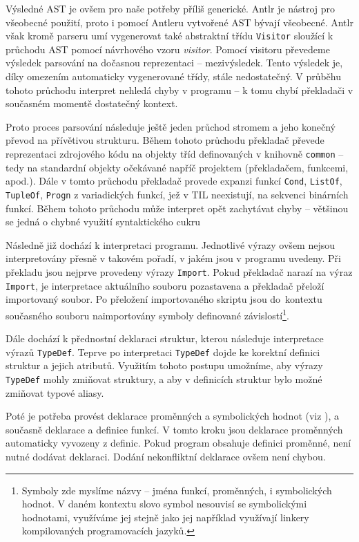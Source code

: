 Výsledné AST je ovšem pro naše potřeby příliš generické. Antlr je nástroj pro všeobecné použití,
proto i pomocí Antleru vytvořené AST bývají všeobecné. Antlr však kromě parseru umí vygenerovat také
abstraktní třídu \lstinline{Visitor} sloužící k průchodu AST pomocí návrhového vzoru
\textit{visitor}. Pomocí visitoru převedeme výsledek parsování na dočasnou reprezentaci --
mezivýsledek. Tento výsledek je, díky omezením automaticky vygenerované třídy, stále nedostatečný.
V průběhu tohoto průchodu interpret nehledá chyby v programu -- k tomu chybí překladači v současném
momentě dostatečný kontext.

Proto proces parsování následuje ještě jeden průchod stromem a jeho konečný převod na přívětivou
strukturu. Během tohoto průchodu překladač převede reprezentaci zdrojového kódu na objekty tříd
definovaných v knihovně \lstinline{common} -- tedy na standardní objekty očekávané napříč projektem
(překladačem, funkcemi, apod.). Dále v tomto průchodu překladač provede expanzi funkcí
\lstinline{Cond}, \lstinline{ListOf}, \lstinline{TupleOf}, \lstinline{Progn} z variadických funkcí,
jež v TIL neexistují, na sekvenci binárních funkcí. Během tohoto průchodu může interpret opět
zachytávat chyby -- většinou se jedná o chybné využití syntaktického cukru

Následně již dochází k interpretaci programu. Jednotlivé výrazy ovšem nejsou interpretovány přesně
v takovém pořadí, v jakém jsou v programu uvedeny. Při překladu jsou nejprve provedeny výrazy
\lstinline{Import}. Pokud překladač narazí na výraz \lstinline{Import}, je interpretace aktuálního
souboru pozastavena a překladač přeloží importovaný soubor. Po přeložení importovaného skriptu
jsou do~kontextu současného souboru naimportovány symboly definované závislostí\footnote{
  Symboly zde myslíme názvy -- jména funkcí, proměnných, i symbolických hodnot. V daném kontextu
  slovo symbol nesouvisí se symbolickými hodnotami, využíváme jej stejně jako jej například
  využívají linkery kompilovaných programovacích jazyků.
}.

Dále dochází k přednostní deklaraci struktur, kterou následuje interpretace výrazů
\lstinline{TypeDef}. Teprve po interpretaci \lstinline{TypeDef} dojde ke korektní definici struktur
a jejich atributů. Využitím tohoto postupu umožníme, aby výrazy \lstinline{TypeDef} mohly zmiňovat
struktury, a aby v definicích struktur bylo možné zmiňovat typové aliasy.

Poté je potřeba provést deklarace proměnných a symbolických hodnot (viz ),
a současně deklarace a definice funkcí. V tomto kroku jsou deklarace proměnných automaticky
vyvozeny z definic. Pokud program obsahuje definici proměnné, není nutné dodávat deklaraci. Dodání
nekonfliktní deklarace ovšem není chybou.

